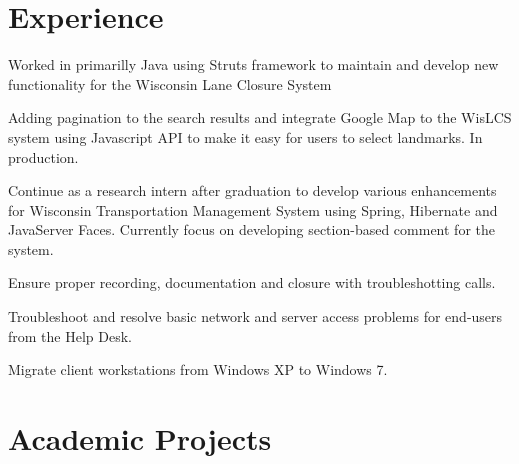 \documentclass[]{deedy-resume-openfont}
\begin{document}
\begin{minipage}[t]{0.67\textwidth} 


\section{Experience}

\vspace{\topsep} %
\begin{tightemize}
\item Worked in primarilly Java using Struts framework to maintain and develop new functionality for the Wisconsin Lane Closure System
\item Adding pagination to the search results and integrate Google Map to the WisLCS system using Javascript API to make it easy for users to select landmarks. In production.
\item Continue as a research intern after graduation to develop various enhancements for Wisconsin Transportation Management System using Spring, Hibernate and JavaServer Faces. Currently focus on developing section-based comment for the system.
\end{tightemize}
\sectionsep

\begin{tightemize}
\item Ensure proper recording, documentation and closure with troubleshotting calls.
\item Troubleshoot and resolve basic network and server access problems for end-users from the Help Desk. 
\item Migrate client workstations from Windows XP to Windows 7.
\end{tightemize}
\sectionsep


\section{Academic Projects}


\end{minipage}
\end{document}
